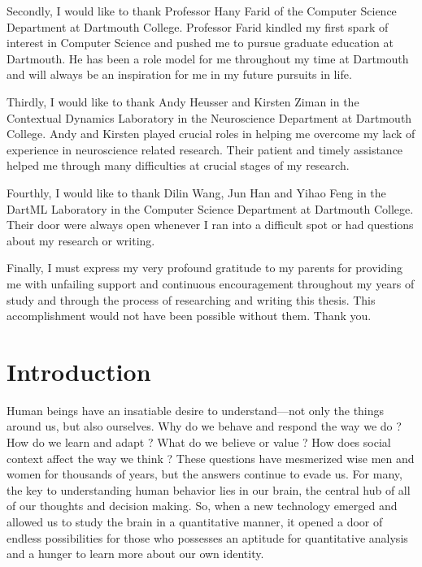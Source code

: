 \documentclass[11pt]{article}
\begin{document}
Secondly, I would like to thank Professor Hany Farid of the Computer Science Department at Dartmouth College. Professor Farid kindled my first spark of interest in Computer Science and pushed me to pursue graduate education at Dartmouth. He has been a role model for me throughout my time at Dartmouth and will always be an inspiration for me in my future pursuits in life.

Thirdly, I would like to thank Andy Heusser and Kirsten Ziman in the Contextual Dynamics Laboratory in the Neuroscience Department at Dartmouth College. Andy and Kirsten played crucial roles in helping me overcome my lack of experience in neuroscience related research. Their patient and timely assistance helped me through many difficulties at crucial stages of my research.

Fourthly, I would like to thank Dilin Wang, Jun Han and Yihao Feng in the DartML Laboratory in the Computer Science Department at Dartmouth College. Their door were always open whenever I ran into a difficult spot or had questions about my research or writing.

Finally, I must express my very profound gratitude to my parents for providing me with unfailing support and continuous encouragement throughout my years of study and through the process of researching and writing this thesis. This accomplishment would not have been possible without them. Thank you.

\newpage
\tableofcontents
\newpage
\listoffigures
\newpage
{}

\section{Introduction}
Human beings have an insatiable desire to understand---not only the things around us, but also ourselves. Why do we behave and respond the way we do \citep{hasson2012}? How do we learn and adapt \citep{hasson2004,hasson2005}? What do we believe or value \citep{Greene01}? How does social context affect the way we think \citep{Matthew2015}? These questions have mesmerized wise men and women for thousands of years, but the answers continue to evade us. For many, the key to understanding human behavior lies in our brain, the central hub of all of our thoughts and decision making. So, when a new technology emerged and allowed us to study the brain in a quantitative manner, it opened a door of endless possibilities for those who possesses an aptitude for quantitative analysis and a hunger to learn more about our own identity.
\end{document}
